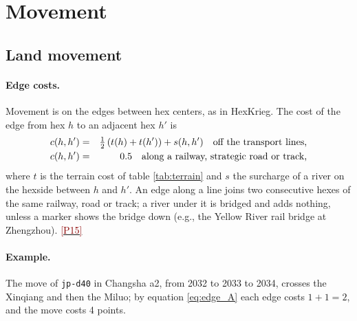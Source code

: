 \documentclass[11pt]{article}
\newcommand{\ptest}[1]{\hyperlink{ptest}{\textcolor{darkred}{[P#1]}}}
\begin{document}
\section{Movement}\label{sec:movement}
\subsection{Land movement}\label{sub:move}
\paragraph{Edge costs.} Movement is on the edges between hex centers, as in HexKrieg. The cost of the edge from hex $h$ to an adjacent hex $h'$ is
\begin{eqnarray}
c(h,h') &=& \tfrac{1}{2}\left(t(h)+t(h')\right)+s(h,h') \mbox{\quad off the transport lines,} \label{eq:edge_A}\\
c(h,h') &=& 0.5 \mbox{\quad along a railway, strategic road or track,} \label{eq:edge_B}
\end{eqnarray}
where $t$ is the terrain cost of table \ref{tab:terrain} and $s$ the surcharge of a river on the hexside between $h$ and $h'$. An edge along a line joins two consecutive hexes of the same railway, road or track; a river under it is bridged and adds nothing, unless a marker shows the bridge down (e.g., the Yellow River rail bridge at Zhengzhou). \ptest{15}

\paragraph{Example.} The move of \texttt{jp-d40} in Changsha a2, from 2032 to 2033 to 2034, crosses the Xinqiang and then the Miluo; by equation \eqref{eq:edge_A} each edge costs $1+1=2$, and the move costs 4 points.
\end{document}
